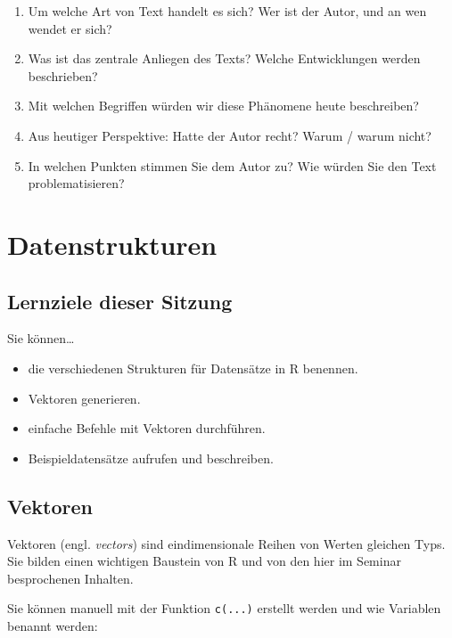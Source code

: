 \documentclass[
  ngerman,
]{article}
\providecommand{\tightlist}{%
  \setlength{\itemsep}{0pt}\setlength{\parskip}{0pt}}
\begin{document}
\begin{enumerate}
\def\labelenumi{\arabic{enumi}.}
\tightlist
\item
  Um welche Art von Text handelt es sich? Wer ist der Autor, und an wen wendet er sich?
\item
  Was ist das zentrale Anliegen des Texts? Welche Entwicklungen werden beschrieben?
\item
  Mit welchen Begriffen würden wir diese Phänomene heute beschreiben?
\item
  Aus heutiger Perspektive: Hatte der Autor recht? Warum / warum nicht?
\item
  In welchen Punkten stimmen Sie dem Autor zu? Wie würden Sie den Text problematisieren?
\end{enumerate}

\hypertarget{datenstrukturen}{%
\section{Datenstrukturen}\label{datenstrukturen}}

\hypertarget{lernziele-dieser-sitzung}{%
\subsection{Lernziele dieser Sitzung}\label{lernziele-dieser-sitzung}}

Sie können\ldots{}

\begin{itemize}
\tightlist
\item
  die verschiedenen Strukturen für Datensätze in R benennen.
\item
  Vektoren generieren.
\item
  einfache Befehle mit Vektoren durchführen.
\item
  Beispieldatensätze aufrufen und beschreiben.
\end{itemize}

\hypertarget{vektoren}{%
\subsection{Vektoren}\label{vektoren}}

Vektoren (engl. \emph{vectors}) sind eindimensionale Reihen von Werten gleichen Typs. Sie bilden einen wichtigen Baustein von R und von den hier im Seminar besprochenen Inhalten.

Sie können manuell mit der Funktion \texttt{c(...)} erstellt werden und wie Variablen benannt werden:
\end{document}
